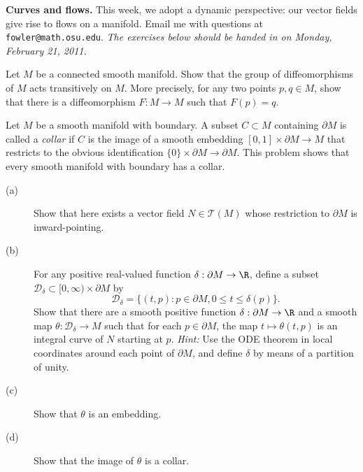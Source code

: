 \documentclass[12pt]{pset}
\author{Jim Fowler}
\date{Winter 2011}
\begin{document}
\maketitle

\noindent\textbf{Curves and flows.}  This week, we adopt a dynamic
perspective: our vector fields give rise to flows on a manifold.
Email me with questions at \texttt{fowler@math.osu.edu}.  \textit{The
  exercises below should be handed in on Monday, February 21, 2011.}

\begin{problem}[Lee 17--4]

  Let $M$ be a connected smooth manifold.  Show that the group of
  diffeomorphisms of $M$ acts transitively on $M$.  More precisely,
  for any two points $p,q \in M$, show that there is a diffeomorphism
  $F : M \to M$ such that $F(p) = q$.

\end{problem}

\vfill

\begin{problem}

Let $M$ be a smooth manifold with boundary.  A subset $C \subset M$
containing $\partial M$ is called a \textit{collar} if $C$ is the
image of a smooth embedding $[0,1] \times \partial M \to M$ that
restricts to the obvious identification $\{ 0 \} \times \partial M
\to \partial M$.  This problem shows that every smooth manifold with
boundary has a collar.
\begin{description}
  \item[(a)] Show that here exists a vector field $N \in
    \mathcal{T}(M)$ whose restriction to $\partial M$ is
    inward-pointing.
    \item[(b)] For any positive real-valued function $\delta
      : \partial M \to \R$, define a subset $\mathcal{D}_\delta \subset
      [0,\infty) \times \partial M$ by
$$
\mathcal{D}_\delta = \{ (t,p) : p \in \partial M, 0 \leq t \leq
\delta(p) \}.
$$
Show that there are a smooth positive function $\delta : \partial M
\to \R$ and a smooth map $\theta : \mathcal{D}_\delta \to M$ such that
for each $p \in \partial M$, the map $t \mapsto \theta(t,p)$ is an
integral curve of $N$ starting at $p$.  \textit{Hint:} Use the ODE
theorem in local coordinates around each point of $\partial M$, and
define $\delta$ by means of a partition of unity.
\item[(c)] Show that $\theta$ is an embedding.
\item[(d)] Show that the image of $\theta$ is a collar.
\end{description}

\end{problem}
\end{document}

